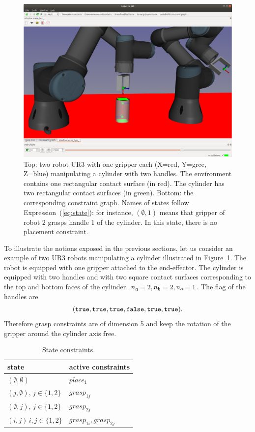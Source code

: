 \begin{figure}
  \begin{center}
    \includegraphics[width=\linewidth]{figures/example.png}
    \def\svgwidth{\columnwidth}
    \graphicspath{{./figures/}}
    
  \end{center}
  \caption{Top: two robot UR3 with one gripper each (X=red, Y=gree, Z=blue) manipulating a cylinder with two handles. The environment contains one rectangular contact surface (in red). The cylinder has two rectangular contact surfaces (in green).
  Bottom: the corresponding constraint graph. Names of states follow Expression~(\ref{eq:state}): for instance, $(\emptyset,1)$ means that gripper of robot 2 grasps handle 1 of the cylinder. In this state, there is no placement constraint.}
  \label{fig:2ur3-cylinder}
\end{figure}
To illustrate the notions exposed in the previous sections, let us consider an example of two UR3 robots manipulating a cylinder illustrated in Figure~\ref{fig:2ur3-cylinder}. The robot is equipped with one gripper attached to the end-effector. The cylinder is equipped with two handles and with two square contact surfaces corresponding to the top and bottom faces of the cylinder. $n_{\mathfrak{g}}=2,n_{\mathfrak{h}}=2,n_{o}=1$. The flag of the handles are
$$(\texttt{true},\texttt{true},\texttt{true},\texttt{false},\texttt{true},\texttt{true}).$$
Therefore grasp constraints are of dimension 5 and keep the rotation of the gripper around the cylinder axis free.
\begin{table}
  \begin{center}
    \begin{tabular}{|p{.44\linewidth}|p{.44\linewidth}|}
      \hline
      state & active constraints\\
      \hline
      $(\emptyset,\emptyset)$ & $place_1$ \\
      $(j,\emptyset),\,j\in\{1,2\}$ & $grasp_{1j}$\\
      $(\emptyset,j),\,j\in\{1,2\}$ & $grasp_{2j}$\\
      $(i,j)\,i,j\in\{1,2\}$ & $grasp_{1i},grasp_{2j}$\\
      \hline
    \end{tabular}
  \end{center}
  \caption{State constraints.}
  \label{tab:state-constraints}
\end{table}
